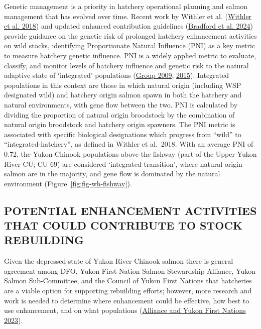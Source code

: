 \documentclass[11pt]{book}
\begin{document}
Genetic management is a priority in hatchery operational planning and salmon management that has evolved over time. Recent work by Withler et al. (\protect\hyperlink{ref-withler2018}{Withler et al. 2018}) and updated enhanced contribution guidelines (\protect\hyperlink{ref-bradford2024}{Bradford et al. 2024}) provide guidance on the genetic risk of prolonged hatchery enhancement activities on wild stocks, identifying Proportionate Natural Influence (PNI) as a key metric to measure hatchery genetic influence. PNI is a widely applied metric to evaluate, classify, and monitor levels of hatchery influence and genetic risk to the natural adaptive state of `integrated' populations (\protect\hyperlink{ref-HSRG2009}{Group 2009}, \protect\hyperlink{ref-HSRG2015}{2015}). Integrated populations in this context are those in which natural origin (including WSP designated wild) and hatchery origin salmon spawn in both the hatchery and natural environments, with gene flow between the two. PNI is calculated by dividing the proportion of natural origin broodstock by the combination of natural origin broodstock and hatchery origin spawners. The PNI metric is associated with specific biological designations which progress from ``wild'' to ``integrated-hatchery'', as defined in Withler et al.~2018. With an average PNI of 0.72, the Yukon Chinook populations above the fishway (part of the Upper Yukon River CU; CU 69) are considered `integrated-transition', where natural origin salmon are in the majority, and gene flow is dominated by the natural environment (Figure~\ref{fig:fig-wh-fishway}).

\hypertarget{potential-enhancement-activities-that-could-contribute-to-stock-rebuilding}{%
\subsection{POTENTIAL ENHANCEMENT ACTIVITIES THAT COULD CONTRIBUTE TO STOCK REBUILDING}\label{potential-enhancement-activities-that-could-contribute-to-stock-rebuilding}}

Given the depressed state of Yukon River Chinook salmon there is general agreement among DFO, Yukon First Nation Salmon Stewardship Alliance, Yukon Salmon Sub-Committee, and the Council of Yukon First Nations that hatcheries are a viable option for supporting rebuilding efforts; however, more research and work is needed to determine where enhancement could be effective, how best to use enhancement, and on what populations (\protect\hyperlink{ref-YFNSSA2023}{Alliance and Yukon First Nations 2023}).
\end{document}

